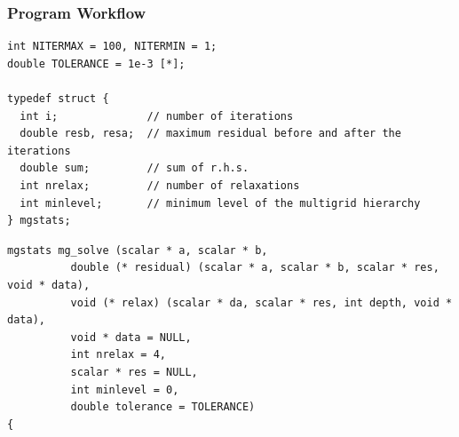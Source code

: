 \documentclass[a4paper]{article}
\newcommand{\func}[1]{\textbf{\textcolor{function}{#1}}}
\newcommand{\para}[1]{\textbf{\emph{\textcolor{para}{#1}}}}
\begin{document}
\subsubsection{Program Workflow}
\begin{multicols}{2}
 \columnbreak
 \begin{verbatim}
int NITERMAX = 100, NITERMIN = 1;
double TOLERANCE = 1e-3 [*];

typedef struct {
  int i;              // number of iterations
  double resb, resa;  // maximum residual before and after the iterations
  double sum;         // sum of r.h.s.
  int nrelax;         // number of relaxations
  int minlevel;       // minimum level of the multigrid hierarchy
} mgstats;
 \end{verbatim}
 
\end{multicols}

\begin{center}
\end{center}

\begin{multicols}{2}
  \columnbreak
  \begin{verbatim}
mgstats mg_solve (scalar * a, scalar * b,
		  double (* residual) (scalar * a, scalar * b, scalar * res, void * data),
		  void (* relax) (scalar * da, scalar * res, int depth, void * data),
		  void * data = NULL,
		  int nrelax = 4,
		  scalar * res = NULL,
		  int minlevel = 0,
		  double tolerance = TOLERANCE)
{
   \end{verbatim}
\end{multicols}
\end{document}
